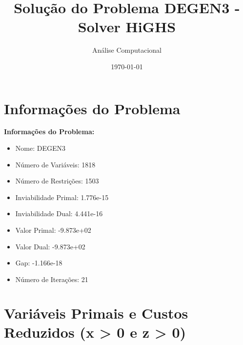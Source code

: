 \documentclass[12pt]{article}
\title{Solução do Problema DEGEN3 - Solver HiGHS}
\author{Análise Computacional}
\date{\today}
\begin{document}
\maketitle

\section{Informações do Problema}

\textbf{Informações do Problema:}
\begin{itemize}
\item Nome: DEGEN3
\item Número de Variáveis: 1818
\item Número de Restrições: 1503
\item Inviabilidade Primal: 1.776e-15
\item Inviabilidade Dual: 4.441e-16
\item Valor Primal: -9.873e+02
\item Valor Dual: -9.873e+02
\item Gap: -1.166e-18
\item Número de Iterações: 21
\end{itemize}


\section{Variáveis Primais e Custos Reduzidos (x > 0 e z > 0)}
\end{document}
